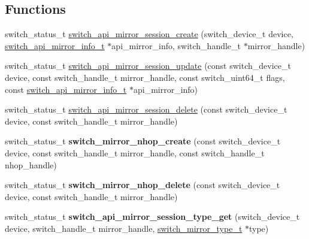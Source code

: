 \subsection*{Functions}
\begin{DoxyCompactItemize}
\item 
switch\+\_\+status\+\_\+t \hyperlink{group__Mirror_gae9d6660d71a3bd4596a1dfe6f65ee5af}{switch\+\_\+api\+\_\+mirror\+\_\+session\+\_\+create} (switch\+\_\+device\+\_\+t device, \hyperlink{group__Mirror_gac1b339df3793f4dfdd6603bb17b36f0a}{switch\+\_\+api\+\_\+mirror\+\_\+info\+\_\+t} $\ast$api\+\_\+mirror\+\_\+info, switch\+\_\+handle\+\_\+t $\ast$mirror\+\_\+handle)
\item 
switch\+\_\+status\+\_\+t \hyperlink{group__Mirror_ga84db182d7bc3f245e0fb2c9c7df4c1ca}{switch\+\_\+api\+\_\+mirror\+\_\+session\+\_\+update} (const switch\+\_\+device\+\_\+t device, const switch\+\_\+handle\+\_\+t mirror\+\_\+handle, const switch\+\_\+uint64\+\_\+t flags, const \hyperlink{group__Mirror_gac1b339df3793f4dfdd6603bb17b36f0a}{switch\+\_\+api\+\_\+mirror\+\_\+info\+\_\+t} $\ast$api\+\_\+mirror\+\_\+info)
\item 
switch\+\_\+status\+\_\+t \hyperlink{group__Mirror_ga9409211a8c1af0bd67d38a8e0322be05}{switch\+\_\+api\+\_\+mirror\+\_\+session\+\_\+delete} (const switch\+\_\+device\+\_\+t device, const switch\+\_\+handle\+\_\+t mirror\+\_\+handle)
\item 
\hypertarget{group__Mirror_gad49967af50f0a123c0df9807f8174e8b}{switch\+\_\+status\+\_\+t {\bfseries switch\+\_\+mirror\+\_\+nhop\+\_\+create} (const switch\+\_\+device\+\_\+t device, const switch\+\_\+handle\+\_\+t mirror\+\_\+handle, const switch\+\_\+handle\+\_\+t nhop\+\_\+handle)}\label{group__Mirror_gad49967af50f0a123c0df9807f8174e8b}

\item 
\hypertarget{group__Mirror_gada7c7f034a4540d2fcd3d966ad8ebca0}{switch\+\_\+status\+\_\+t {\bfseries switch\+\_\+mirror\+\_\+nhop\+\_\+delete} (const switch\+\_\+device\+\_\+t device, const switch\+\_\+handle\+\_\+t mirror\+\_\+handle)}\label{group__Mirror_gada7c7f034a4540d2fcd3d966ad8ebca0}

\item 
\hypertarget{group__Mirror_ga0cc6709dc921a6d11b8edaefaaf63146}{switch\+\_\+status\+\_\+t {\bfseries switch\+\_\+api\+\_\+mirror\+\_\+session\+\_\+type\+\_\+get} (switch\+\_\+device\+\_\+t device, switch\+\_\+handle\+\_\+t mirror\+\_\+handle, \hyperlink{group__Mirror_gab7f122c0c6b29dbe9f63ceea0603a2c9}{switch\+\_\+mirror\+\_\+type\+\_\+t} $\ast$type)}\label{group__Mirror_ga0cc6709dc921a6d11b8edaefaaf63146}


\end{DoxyCompactItemize}
